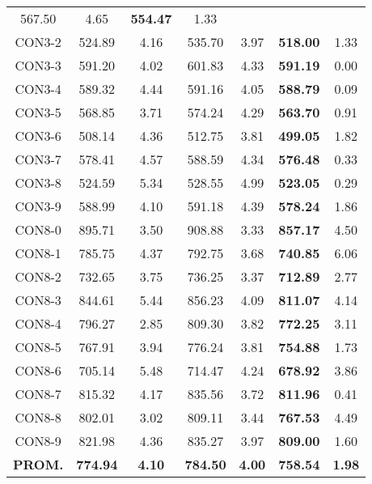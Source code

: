 \begin{table}[ht]
\begin{tabular}{c c c c c c c}
567.50 & 4.65 & \bf{554.47} & 
1.33\\CON3-2 & 524.89 & 4.16 & 
535.70 & 3.97 & \bf{518.00} & 
1.33\\CON3-3 & 591.20 & 4.02 & 
601.83 & 4.33 & \bf{591.19} & 
0.00\\CON3-4 & 589.32 & 4.44 & 
591.16 & 4.05 & \bf{588.79} & 
0.09\\CON3-5 & 568.85 & 3.71 & 
574.24 & 4.29 & \bf{563.70} & 
0.91\\CON3-6 & 508.14 & 4.36 & 
512.75 & 3.81 & \bf{499.05} & 
1.82\\CON3-7 & 578.41 & 4.57 & 
588.59 & 4.34 & \bf{576.48} & 
0.33\\CON3-8 & 524.59 & 5.34 & 
528.55 & 4.99 & \bf{523.05} & 
0.29\\CON3-9 & 588.99 & 4.10 & 
591.18 & 4.39 & \bf{578.24} & 
1.86\\CON8-0 & 895.71 & 3.50 & 
908.88 & 3.33 & \bf{857.17} & 
4.50\\CON8-1 & 785.75 & 4.37 & 
792.75 & 3.68 & \bf{740.85} & 
6.06\\CON8-2 & 732.65 & 3.75 & 
736.25 & 3.37 & \bf{712.89} & 
2.77\\CON8-3 & 844.61 & 5.44 & 
856.23 & 4.09 & \bf{811.07} & 
4.14\\CON8-4 & 796.27 & 2.85 & 
809.30 & 3.82 & \bf{772.25} & 
3.11\\CON8-5 & 767.91 & 3.94 & 
776.24 & 3.81 & \bf{754.88} & 
1.73\\CON8-6 & 705.14 & 5.48 & 
714.47 & 4.24 & \bf{678.92} & 
3.86\\CON8-7 & 815.32 & 4.17 & 
835.56 & 3.72 & \bf{811.96} & 
0.41\\CON8-8 & 802.01 & 3.02 & 
809.11 & 3.44 & \bf{767.53} & 
4.49\\CON8-9 & 821.98 & 4.36 & 
835.27 & 3.97 & \bf{809.00} & 
1.60\\\bf{PROM.} & 
\bf{774.94} & \bf{4.10} & \bf{784.50} & \bf{4.00} & \bf{758.54} & \bf{1.98}\\[1ex]\hline
\end{tabular}
\label{table:nonlin}
\end{table} \clearpage

